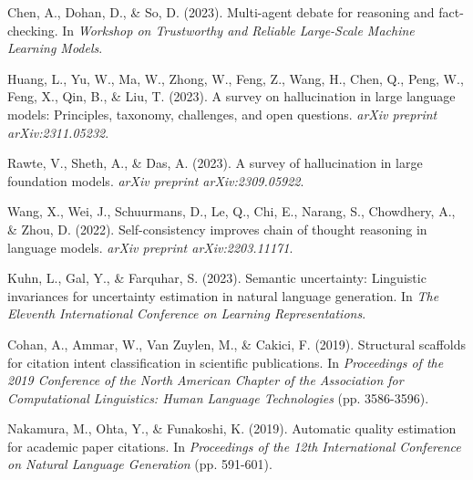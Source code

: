 \documentclass{article}
\begin{document}
\begin{thebibliography}{99}
Chen, A., Dohan, D., \& So, D. (2023). Multi-agent debate for reasoning and fact-checking. In \textit{Workshop on Trustworthy and Reliable Large-Scale Machine Learning Models}.

Huang, L., Yu, W., Ma, W., Zhong, W., Feng, Z., Wang, H., Chen, Q., Peng, W., Feng, X., Qin, B., \& Liu, T. (2023). A survey on hallucination in large language models: Principles, taxonomy, challenges, and open questions. \textit{arXiv preprint arXiv:2311.05232}.

Rawte, V., Sheth, A., \& Das, A. (2023). A survey of hallucination in large foundation models. \textit{arXiv preprint arXiv:2309.05922}.

Wang, X., Wei, J., Schuurmans, D., Le, Q., Chi, E., Narang, S., Chowdhery, A., \& Zhou, D. (2022). Self-consistency improves chain of thought reasoning in language models. \textit{arXiv preprint arXiv:2203.11171}.

Kuhn, L., Gal, Y., \& Farquhar, S. (2023). Semantic uncertainty: Linguistic invariances for uncertainty estimation in natural language generation. In \textit{The Eleventh International Conference on Learning Representations}.

Cohan, A., Ammar, W., Van Zuylen, M., \& Cakici, F. (2019). Structural scaffolds for citation intent classification in scientific publications. In \textit{Proceedings of the 2019 Conference of the North American Chapter of the Association for Computational Linguistics: Human Language Technologies} (pp. 3586-3596).

Nakamura, M., Ohta, Y., \& Funakoshi, K. (2019). Automatic quality estimation for academic paper citations. In \textit{Proceedings of the 12th International Conference on Natural Language Generation} (pp. 591-601).

\end{thebibliography}
\end{document}
